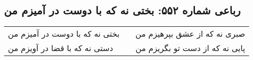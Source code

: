 \begin{center}
\section*{رباعی شماره ۵۵۲: بختی نه که با دوست در آمیزم من}
\label{sec:sh552}
\begin{longtable}{l p{0.5cm} r}
بختی نه که با دوست در آمیزم من
&&
صبری نه که از عشق بپرهیزم من
\\
دستی نه که با قضا در آویزم من
&&
پایی نه که از دست تو بگریزم من
\\
\end{longtable}
\end{center}
